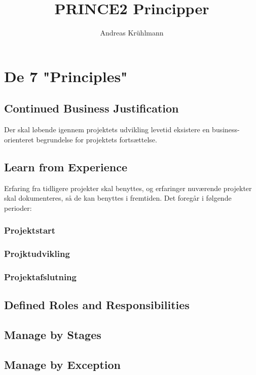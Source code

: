 \documentclass[12pt,twoside]{article}
\title{PRINCE2 Principper}
\author{Andreas Kr\"{u}hlmann}
\begin{document}
    \maketitle
    \newpage
    \tableofcontents
    \newpage
    \section{De 7 "Principles"}

    \subsection{Continued Business Justification}
    Der skal løbende igennem projektets udvikling levetid eksistere en business-orienteret begrundelse for projektets fortsættelse.

    \subsection{Learn from Experience}
    Erfaring fra tidligere projekter skal benyttes, og erfaringer nuværende projekter skal dokumenteres, så de kan benyttes i fremtiden. Det foregår i følgende perioder:

    \subsubsection*{Projektstart}

    \subsubsection*{Projktudvikling}

    \subsubsection*{Projektafslutning}

    \subsection{Defined Roles and Responsibilities}

    \subsection{Manage by Stages}

    \subsection{Manage by Exception}
\end{document}
